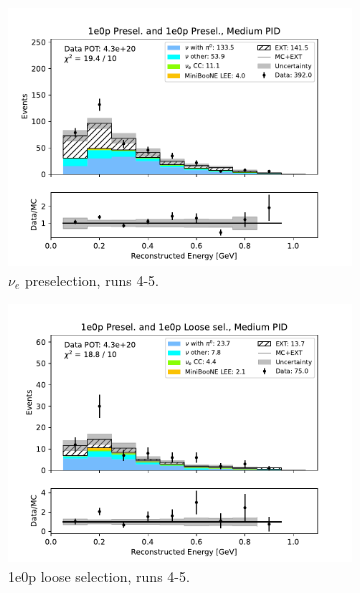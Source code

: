 \begin{figure}[H]
\begin{subfigure}{0.5\linewidth}
        \includegraphics[width=\linewidth]{technote/Sidebands/Figures/NearSideband/near_sideband_reco_e_run4b4c4d5_ZP_ZP_MEDIUM_PID.pdf}
        \caption{$\nu_e$ preselection, runs 4-5.}
    \end{subfigure}%
    \begin{subfigure}{0.5\linewidth}
        \includegraphics[width=\linewidth]{technote/Sidebands/Figures/NearSideband/near_sideband_reco_e_run4b4c4d5_ZP_ZPLOOSESEL_MEDIUM_PID.pdf}
        \caption{1e0p loose selection, runs 4-5.}
    \end{subfigure}    
    \begin{subfigure}{0.5\linewidth}

\end{subfigure}
\end{figure}
